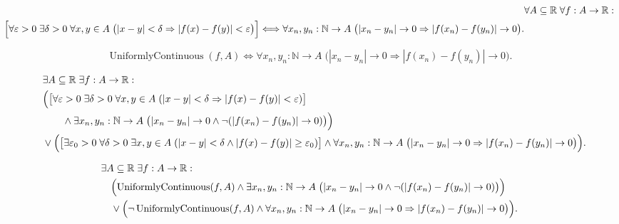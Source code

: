 \begin{remark*}
\[
\begin{aligned}
&\forall A \subseteq \mathbb{R}\;\forall f:A \to \mathbb{R}:\\
\Bigl[\forall \varepsilon>0\;\exists \delta>0\;\forall x,y\in A\;
\bigl(|x-y|<\delta\Rightarrow |f(x)-f(y)|<\varepsilon\bigr)\Bigr]
\Longleftrightarrow
\forall x_n,y_n:\mathbb{N} \to A\;
\bigl(|x_n - y_n| \to 0 \Rightarrow |f(x_n) - f(y_n)| \to 0\bigr).
\end{aligned}
\]
\end{remark*}

\begin{remark*}
\[
\operatorname{UniformlyContinuous}(f,A)
\Longleftrightarrow
\forall x_n,y_n:\mathbb{N} \to A\;
\bigl(|x_n - y_n| \to 0 \Rightarrow |f(x_n) - f(y_n)| \to 0\bigr).
\]
\end{remark*}

\begin{remark*}
\[
\begin{aligned}
&\exists A \subseteq \mathbb{R}\;\exists f:A \to \mathbb{R}:\\
\quad &\Bigl(
\bigl[\forall \varepsilon>0\;\exists \delta>0\;\forall x,y\in A\;
(|x-y|<\delta\Rightarrow |f(x)-f(y)|<\varepsilon)\bigr]\\
&\qquad\land \exists x_n,y_n:\mathbb{N}\to A\;
\bigl(|x_n - y_n| \to 0 \land \neg(|f(x_n) - f(y_n)| \to 0)\bigr)\Bigr)\\
\quad &\lor \Bigl(
\bigl[\exists \varepsilon_0>0\;\forall \delta>0\;\exists x,y\in A\;
(|x-y|<\delta\land |f(x)-f(y)|\ge\varepsilon_0)\bigr]\land
\forall x_n,y_n:\mathbb{N}\to A\;
\bigl(|x_n - y_n| \to 0 \Rightarrow |f(x_n) - f(y_n)| \to 0\bigr)\Bigr).
\end{aligned}
\]
\end{remark*}

\begin{remark*}
\[
\begin{aligned}
&\exists A \subseteq \mathbb{R}\;\exists f:A \to \mathbb{R}:\\
&\quad \Bigl(\operatorname{UniformlyContinuous}(f,A) \land \exists x_n,y_n:\mathbb{N}\to A\;
\bigl(|x_n - y_n| \to 0 \land \neg(|f(x_n) - f(y_n)| \to 0)\bigr)\Bigr)\\
&\quad \lor \Bigl(\neg \operatorname{UniformlyContinuous}(f,A) \land
\forall x_n,y_n:\mathbb{N}\to A\;
\bigl(|x_n - y_n| \to 0 \Rightarrow |f(x_n) - f(y_n)| \to 0\bigr)\Bigr).
\end{aligned}
\]
\end{remark*}

